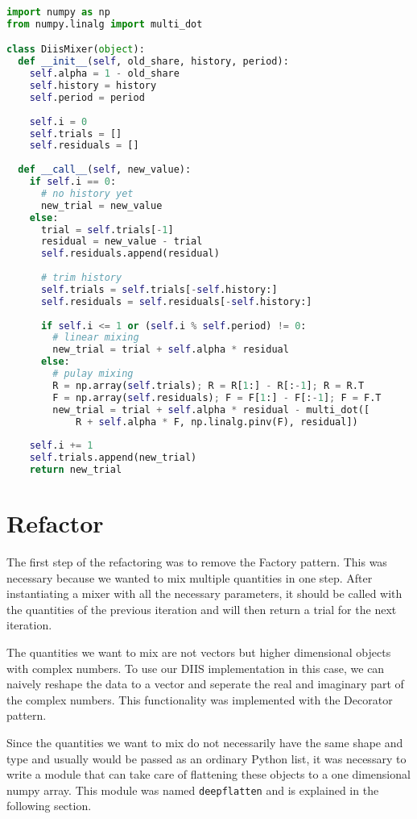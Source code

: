 \begin{lstlisting}[label=lst:diis, language=python, caption=DIIS implementation]
import numpy as np
from numpy.linalg import multi_dot

class DiisMixer(object):
  def __init__(self, old_share, history, period):
    self.alpha = 1 - old_share
    self.history = history
    self.period = period
    
    self.i = 0
    self.trials = []
    self.residuals = []
  
  def __call__(self, new_value):
    if self.i == 0:
      # no history yet
      new_trial = new_value
    else:
      trial = self.trials[-1]
      residual = new_value - trial
      self.residuals.append(residual)
      
      # trim history
      self.trials = self.trials[-self.history:]
      self.residuals = self.residuals[-self.history:]
      
      if self.i <= 1 or (self.i % self.period) != 0:
        # linear mixing
        new_trial = trial + self.alpha * residual
      else:
        # pulay mixing
        R = np.array(self.trials); R = R[1:] - R[:-1]; R = R.T
        F = np.array(self.residuals); F = F[1:] - F[:-1]; F = F.T
        new_trial = trial + self.alpha * residual - multi_dot([
            R + self.alpha * F, np.linalg.pinv(F), residual])
    
    self.i += 1
    self.trials.append(new_trial)
    return new_trial
\end{lstlisting}

\section{Refactor}
The first step of the refactoring was to remove the Factory pattern. This was necessary because we wanted to mix multiple quantities in one step. After instantiating a mixer with all the necessary parameters, it should be called with the quantities of the previous iteration and will then return a trial for the next iteration.

The quantities we want to mix are not vectors but higher dimensional objects with complex numbers. To use our DIIS implementation in this case, we can naively reshape the data to a vector and seperate the real and imaginary part of the complex numbers. This functionality was implemented with the Decorator pattern.

Since the quantities we want to mix do not necessarily have the same shape and type and usually would be passed as an ordinary Python list, it was necessary to write a module that can take care of flattening these objects to a one dimensional numpy array. This module was named \texttt{deepflatten} and is explained in the following section.

